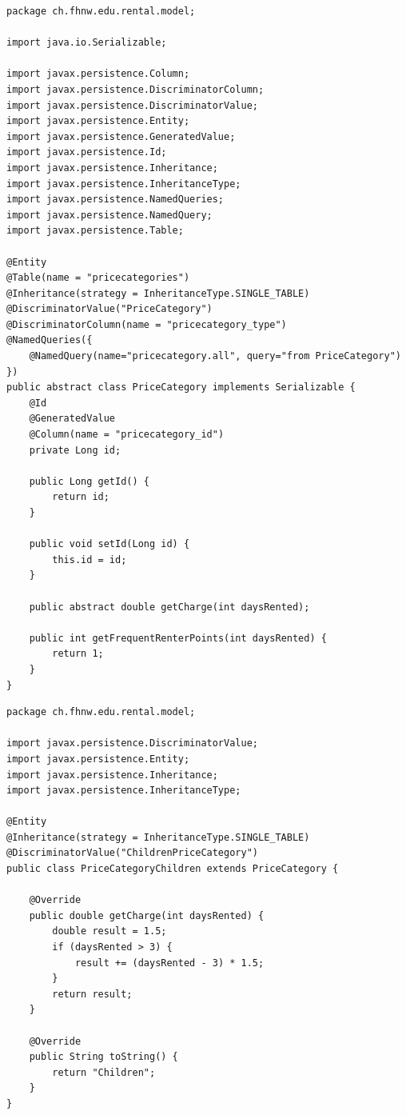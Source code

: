 \documentclass[a4paper,10pt]{scrreprt}
\begin{document}
\begin{lstlisting}[caption=Price Category]
 package ch.fhnw.edu.rental.model;

import java.io.Serializable;

import javax.persistence.Column;
import javax.persistence.DiscriminatorColumn;
import javax.persistence.DiscriminatorValue;
import javax.persistence.Entity;
import javax.persistence.GeneratedValue;
import javax.persistence.Id;
import javax.persistence.Inheritance;
import javax.persistence.InheritanceType;
import javax.persistence.NamedQueries;
import javax.persistence.NamedQuery;
import javax.persistence.Table;

@Entity
@Table(name = "pricecategories")
@Inheritance(strategy = InheritanceType.SINGLE_TABLE)
@DiscriminatorValue("PriceCategory")
@DiscriminatorColumn(name = "pricecategory_type")
@NamedQueries({
	@NamedQuery(name="pricecategory.all", query="from PriceCategory")
})
public abstract class PriceCategory implements Serializable {
	@Id
	@GeneratedValue
	@Column(name = "pricecategory_id")
	private Long id;

	public Long getId() {
		return id;
	}

	public void setId(Long id) {
		this.id = id;
	}

	public abstract double getCharge(int daysRented);

	public int getFrequentRenterPoints(int daysRented) {
		return 1;
	}
}

\end{lstlisting}
\begin{lstlisting}[caption=PriceCategory Type Children]
 package ch.fhnw.edu.rental.model;

import javax.persistence.DiscriminatorValue;
import javax.persistence.Entity;
import javax.persistence.Inheritance;
import javax.persistence.InheritanceType;

@Entity
@Inheritance(strategy = InheritanceType.SINGLE_TABLE)
@DiscriminatorValue("ChildrenPriceCategory")
public class PriceCategoryChildren extends PriceCategory {

	@Override
	public double getCharge(int daysRented) {
		double result = 1.5;
		if (daysRented > 3) {
			result += (daysRented - 3) * 1.5;
		}
		return result;
	}

	@Override
	public String toString() {
		return "Children";
	}
}

\end{lstlisting}
\end{document}

